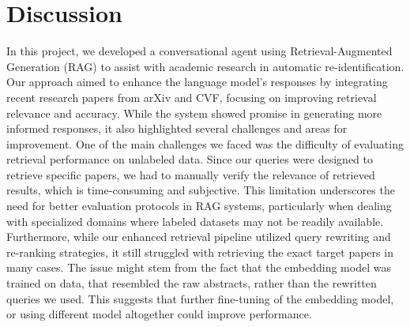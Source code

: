 \documentclass[fleqn,moreauthors,10pt]{ds_report}
\begin{document}



\section*{Discussion}
In this project, we developed a conversational agent using Retrieval-Augmented Generation (RAG) to assist with academic research in automatic re-identification. Our approach aimed to enhance the language model's responses by integrating recent research papers from arXiv and CVF, focusing on improving retrieval relevance and accuracy. 
While the system showed promise in generating more informed responses, it also highlighted several challenges and areas for improvement.
One of the main challenges we faced was the difficulty of evaluating retrieval performance on unlabeled data. Since our queries were designed to retrieve specific papers, we had to manually verify the relevance of retrieved results, which is time-consuming and subjective. This limitation underscores the need for better evaluation protocols in RAG systems, particularly when dealing with specialized domains where labeled datasets may not be readily available.
Furthermore, while our enhanced retrieval pipeline utilized query rewriting and re-ranking strategies, it still struggled with retrieving the exact target papers in many cases. The issue might stem from the fact that the embedding model was trained on data, that resembled the raw abstracts, rather than the rewritten queries we used. This suggests that further fine-tuning of the embedding model, or using different model altogether could improve performance.





\end{document}
